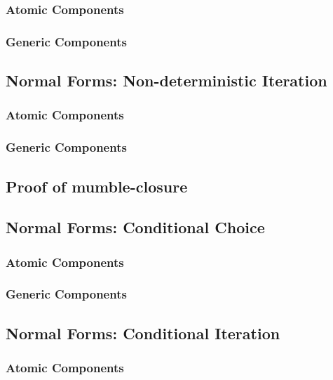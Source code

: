 \subsubsection{Atomic Components}

\subsubsection{Generic Components}

\subsection{Normal Forms: Non-deterministic Iteration}

\subsubsection{Atomic Components}

\subsubsection{Generic Components}

\subsection{Proof of mumble-closure}

\subsection{Normal Forms: Conditional Choice}

\subsubsection{Atomic Components}

\subsubsection{Generic Components}

\subsection{Normal Forms: Conditional Iteration}

\subsubsection{Atomic Components}

